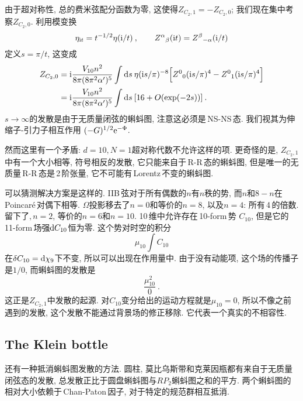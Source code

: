 由于超对称性, 总的费米弦配分函数为零, 这使得$ Z_{C_{2},1}=-Z_{C_{2},0}$; 我们现在集中考察$ Z_{C_{2},0}$. 利用模变换
\begin{equation}
    \eta_{\mathrm{i} t} =t^{-1/2} \eta(\mathrm{i}/t) \:, \qquad Z^{\alpha}{}_{\beta}(\mathrm{i} t) = Z^{\beta}{}_{-\alpha}(\mathrm{i}/t)\label{10.8.3}
\end{equation}
定义$ s=\pi/t$, 这变成
\begin{align}
    Z_{C_{2},0} &= \mathrm{i} \frac{V_{10}n^{2}}{8\pi(8\pi^{2}\alpha^{\prime})^{5}}
    \int \mathrm{d} s\:\eta(\mathrm{i} s/\pi)^{-8}\Bigl[Z^{0}{}_{0}(\mathrm{i} s/\pi)^{4}- Z^{0}{}_{1}(\mathrm{i} s/\pi)^{4} \Bigr] \nonumber \\
    &=\mathrm{i} \frac{V_{10}n^{2}}{8\pi(8\pi^{2}\alpha^{\prime})^{5}}
    \int \mathrm{d} s\: [16 + O(\exp(-2s))] \:. \label{10.8.4}
\end{align}
$s\to\infty $的发散是由于无质量闭弦的蝌蚪图, 注意这必须是\,NS-NS\,态. 我们视其为伸缩子-引力子相互作用 $(-G)^{1/2}\mathrm{e}^{-\Phi}$.

然而这里有一个矛盾: $d=10,N=1 $超对称代数不允许这样的项. 更奇怪的是, $Z_{C_{2},1} $中有一个大小相等, 符号相反的发散, 它只能来自于\,R-R\,态的蝌蚪图, 但是唯一的无质量\,R-R\,态是\,2\,阶张量, 它不可能有\,Lorentz\,不变的蝌蚪图.

可以猜测解决方案是这样的. IIB\,弦对于所有偶数的$ n $有$ n $秩的势, 而$ n $和$ 8-n $在\,Poincar\'{e}\,对偶下相等. $\Omega $投影移去了$ n=0 $和等价的$ n=8$, 以及$ n=4$: 所有\,4\,的倍数. 留下了$,n=2$, 等价的$ n=6 $和$ n=10$. 10\,维中允许存在\,10-form\,势 $C_{10}$, 但是它的\,11-form\,场强$ \mathrm{d} C_{10} $恒为零. 这个势对时空的积分
\begin{equation}
    \mu_{10}\int C_{10} \label{10.8.5}
\end{equation}
在$ \delta C_{10}=\mathrm{d} \chi_{9} $下不变, 所以可以出现在作用量中. 由于没有动能项, 这个场的传播子是$ 1/0$, 而蝌蚪图的发散是
\begin{equation}
    \frac{\mu^{2}_{10}}{0} \:. \label{10.8.6}
\end{equation}
这正是$ Z_{C_{2},1} $中发散的起源. 对$ C_{10} $变分给出的运动方程就是$ \mu_{10}=0$, 所以不像之前遇到的发散, 这个发散不能通过背景场的修正移除. 它代表一个真实的不相容性.

\subsection*{The Klein bottle}

还有一种抵消蝌蚪图发散的方法. 圆柱, 莫比乌斯带和克莱因瓶都有来自于无质量闭弦态的发散, 总发散正比于圆盘蝌蚪图与$ RP_{2} $蝌蚪图之和的平方. 两个蝌蚪图的相对大小依赖于\,Chan-Paton\,因子, 对于特定的规范群相互抵消.

